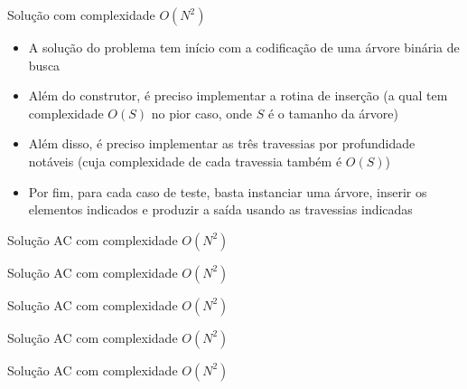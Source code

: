 \begin{frame}[fragile]{Solução com complexidade $O(N^2)$}

    \begin{itemize}
        \item A solução do problema tem início com a codificação de uma árvore binária de
            busca

        \item Além do construtor, é preciso implementar a rotina de inserção (a qual tem
            complexidade $O(S)$ no pior caso, onde $S$ é o tamanho da árvore)

        \item Além disso, é preciso implementar as três travessias por profundidade notáveis
            (cuja complexidade de cada travessia também é $O(S)$)

        \item Por fim, para cada caso de teste, basta instanciar uma árvore, inserir os elementos
            indicados e produzir a saída usando as travessias indicadas
   \end{itemize}

\end{frame}

\begin{frame}[fragile]{Solução AC com complexidade $O(N^2)$}
\end{frame}

\begin{frame}[fragile]{Solução AC com complexidade $O(N^2)$}
\end{frame}

\begin{frame}[fragile]{Solução AC com complexidade $O(N^2)$}
\end{frame}

\begin{frame}[fragile]{Solução AC com complexidade $O(N^2)$}
\end{frame}

\begin{frame}[fragile]{Solução AC com complexidade $O(N^2)$}
\end{frame}
